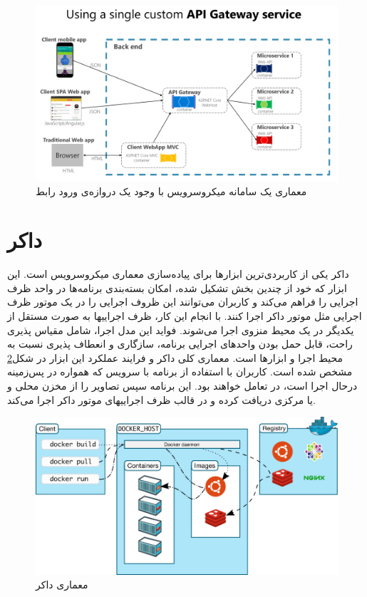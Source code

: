 \begin{figure}[h]
	\vspace{1cm}
	\centering
	\includegraphics[scale=0.5]{figures/custom-service-api-gateway.png}
	\caption{معماری یک سامانه میکروسرویس با وجود یک ‌دروازه‌ی ورود رابط\cite{Microsoft_API_Gateway_2023}}
	\label{fig:api-gateway}
\end{figure}

\section{داکر}
داکر یکی از کاربردی‌ترین ابزار‌ها برای پیاده‌سازی معماری میکروسرویس است. این ابزار که خود از چندین بخش تشکیل شده، امکان بسته‌بندی برنامه‌ها در واحد ظرف اجرایی را فراهم می‌کند و کاربران می‌توانند این ظروف اجرایی را در یک موتور ظرف اجرایی مثل موتور داکر اجرا کنند. با انجام این کار، ظرف اجراییها به صورت مستقل از یکدیگر در یک محیط منزوی اجرا می‌شوند. فواید این مدل اجرا، شامل مقیاس پذیری راحت، قابل حمل بودن واحد‌های اجرایی برنامه، سازگاری و انعطاف پذیری نسبت به محیط اجرا و ابزار‌ها است. معماری کلی داکر و فرایند عملکرد این ابزار در شکل\ref{fig:docker-arch} مشخص شده است. کاربران با استفاده از برنامه  
با سرویس  که همواره در پس‌زمینه در‌حال اجرا است، در تعامل‌ خواهند بود. این برنامه سپس تصاویر را از مخزن محلی و یا مرکزی دریافت کرده و در قالب ظرف اجراییهای موتور داکر اجرا‌ می‌کند.
\begin{figure}[h]
	\vspace{1cm}
	\centering
	\includegraphics[scale=0.4]{figures/docker-architecture.png}
	\caption{معماری داکر}
	\label{fig:docker-arch}
\end{figure}

